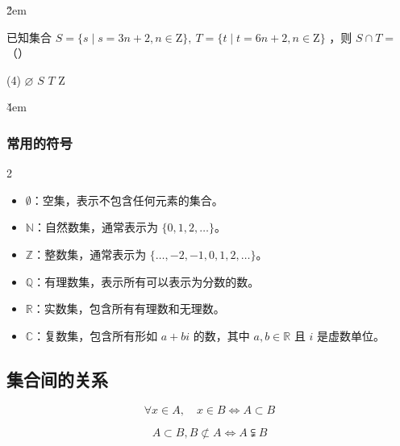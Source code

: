 \v{2em}

\begin{example}
    已知集合 $S=\{s \mid s=3 n+2, n \in \mathrm{Z}\}, ~ T=\{t \mid t=6 n+2, n \in \mathrm{Z}\}$ ，则 $S \cap T=$ （\qquad）
    \begin{tasks}(4)
        \task $\varnothing$
        \task $S$
        \task $T$
        \task Z
    \end{tasks}
\end{example}

\v{4em}

\subsubsection{常用的符号}

\begin{definition}[常用符号]
    \begin{multicols}{2}
        \begin{itemize}
            \item $\emptyset$：空集，表示不包含任何元素的集合。
            \item $\mathbb{N}$：自然数集，通常表示为 $\{0, 1, 2, \ldots\}$。
            \item $\mathbb{Z}$：整数集，通常表示为 $\{\ldots, -2, -1, 0, 1, 2, \ldots\}$。
                  \columnbreak
            \item $\mathbb{Q}$：有理数集，表示所有可以表示为分数的数。
            \item $\mathbb{R}$：实数集，包含所有有理数和无理数。
            \item $\mathbb{C}$：复数集，包含所有形如 $a + bi$ 的数，其中 $a, b \in \mathbb{R}$ 且 $i$ 是虚数单位。
        \end{itemize}
    \end{multicols}
\end{definition}

\subsection{集合间的关系}

\begin{definition}[包含（子集）]
    $$\forall x \in A ,\quad x \in B \iff A\subset B$$
\end{definition}

\begin{definition}
    $$A\subset B, B \not\subset A \iff A \subsetneqq B$$
\end{definition}

